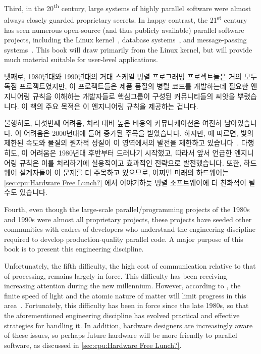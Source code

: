 Third, in the 20\textsuperscript{th} century, large systems of
highly parallel software were almost always closely guarded proprietary
secrets.
In happy contrast, the 21\textsuperscript{st} century has seen numerous
open-source (and thus publicly available) parallel software projects,
including the Linux kernel~\cite{Torvalds2.6kernel},
database systems~\cite{PostgreSQL2008,MySQL2008},
and message-passing systems~\cite{OpenMPI2008,BOINC2008}.
This book will draw primarily from the Linux kernel, but will
provide much material suitable for user-level applications.

\fi

넷째로, 1980년대와 1990년대의 거대 스케일 병렬 프로그래밍 프로젝트들은 거의
모두 독점 프로젝트였지만, 이 프로젝트들은 제품 품질의 병렬 코드를 개발하는데
필요한 엔지니어링 규칙을 이해하는 개발자들로 핵심그룹이 구성된 커뮤니티들의
씨앗을 뿌렸습니다.
이 책의 주요 목적은 이 엔지니어링 규칙을 제공하는 겁니다.

불행히도, 다섯번째 어려움, 처리 대비 높은 비용의 커뮤니케이션은 여전히
남아있습니다.
이 어려움은 2000년대에 들어 증가된 주목을 받았습니다.
하지만,  에 따르면, 빛의 제한된 속도와 물질의 원자적
성질이 이 영역에서의 발전을 제한하고
있습니다~\cite{BryanGardiner2007,GordonMoore03a}.
다행히도, 이 어려움은 1980년대 후반부터 드러나기 시작했고, 따라서 앞서 언급한
엔지니어링 규칙은 이를 처리하기에 실용적이고 효과적인 전략으로 발전했습니다.
또한, 하드웨어 설계자들이 이 문제를 더 주목하고 있으므로, 어쩌면 미래의
하드웨어는 \cref{sec:cpu:Hardware Free Lunch?} 에서 이야기하듯 병렬
소프트웨어에 더 친화적이 될수도 있습니다.

\iffalse

Fourth, even though the large-scale parallel\-/programming projects of
the 1980s and 1990s were almost all proprietary projects, these
projects have seeded other communities with cadres of developers who
understand the engineering discipline required to develop production-quality
parallel code.
A major purpose of this book is to present this engineering discipline.

Unfortunately, the fifth difficulty, the high cost of communication
relative to that of processing, remains largely in force.
This difficulty has been receiving increasing attention during
the new millennium.
However, according to ,
the finite speed of light and the atomic
nature of matter will limit progress in this
area~\cite{BryanGardiner2007,GordonMoore03a}.
Fortunately, this difficulty has been in force since the late 1980s,
so that the aforementioned engineering discipline has evolved practical
and effective strategies for handling it.
In addition, hardware designers are increasingly aware of these issues,
so perhaps future hardware will be more friendly to parallel software,
as discussed in \cref{sec:cpu:Hardware Free Lunch?}.

